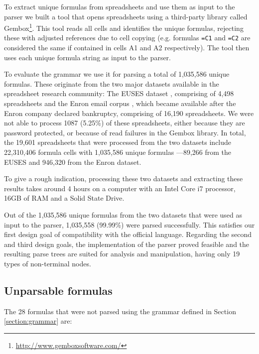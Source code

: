 \documentclass[conference]{IEEEtran}
\begin{document}
To extract unique formulas from spreadsheets and use them as input to the parser we built a tool that opens spreadsheets using a third-party library called Gembox\footnote{\url{http://www.gemboxsoftware.com/}}. This tool reads all cells and identifies the unique formulas, rejecting these with adjusted references due to cell copying (e.g. formulas \texttt{=C1} and \texttt{=C2} are considered the same if contained in cells A1 and A2 respectively). The tool then uses each unique formula string as input to the parser.

To evaluate the grammar we use it for parsing a total of 1,035,586 unique formulas. These originate from the two major datasets available in the spreadsheet research community: The EUSES dataset \cite{euses}, comprising of 4,498 spreadsheets and the Enron email corpus \cite{enron}, which became available after the Enron company declared bankruptcy, comprising of 16,190 spreadsheets. We were not able to process 1087 (5.25\%) of these spreadsheets, either because they are password protected, or because of read failures in the Gembox library. In total, the 19,601 spreadsheets that were processed from the two datasets include 22,310,406 formula cells with 1,035,586 unique formulas ---89,266 from the EUSES and 946,320 from the Enron dataset.

To give a rough indication, processing these two datasets and extracting these results takes around 4 hours on a computer with an Intel Core i7 processor, 16GB of RAM and a Solid State Drive.

Out of the 1,035,586 unique formulas from the two datasets that were used as input to the parser, 1,035,558 (99.99\%) were parsed successfully. This satisfies our first design goal of compatibility with the official language. Regarding the second and third design goals, the implementation of the parser proved feasible and the resulting parse trees are suited for analysis and manipulation, having only 19 types of non-terminal nodes.

\subsection{Unparsable formulas}
\label{subsection:unparsableFormulas}
The 28 formulas that were not parsed using the grammar defined in Section \ref{section:grammar} are:
\end{document}
